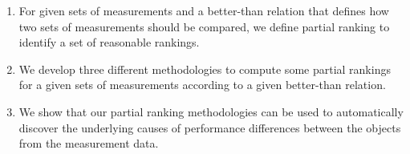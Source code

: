 \documentclass[acmsmall,screen, review]{acmart}
\begin{document}
\begin{enumerate}
	\setlength{\itemsep}{0pt} 
	
	\item  For given sets of measurements and a better-than relation that defines how two sets of  measurements should be compared, we define partial ranking to identify a set of reasonable rankings.
	
	\item We develop three different methodologies to compute some partial rankings for a given sets of measurements according to a given better-than relation.
	
	
	\item We show that our partial ranking methodologies can be used to automatically discover the underlying causes of performance differences between the objects from the measurement data.
	 
	
\end{enumerate}
\end{document}
